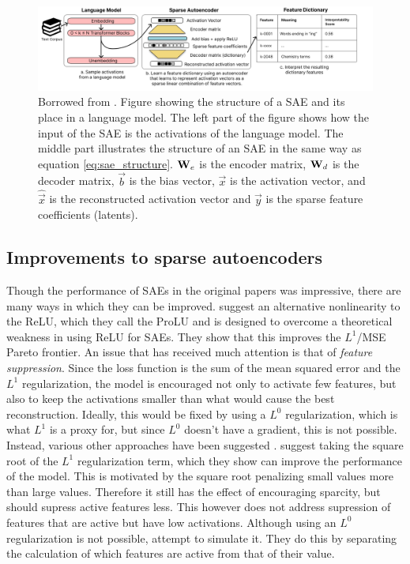 \begin{figure}[ht]
    \centering
    \includegraphics[width=\textwidth]{images/cunningham_sae_illustration.png}
    \caption{Borrowed from \textcite{cunningham_sparse_2023}. 
    Figure showing the structure of a SAE and its place in a language model.
    The left part of the figure shows how the input of the SAE is the activations of the language model.
    The middle part illustrates the structure of an SAE in the same way as equation \ref{eq:sae_structure}.
    $\mathbf{W}_e$ is the encoder matrix, $\mathbf{W}_d$ is the decoder matrix, $\vec b$ is the bias vector, $\vec x$ is the activation vector, and $\hat{\vec x}$ is the reconstructed activation vector and $\vec y$ is the sparse feature coefficients (latents).
    }
    \label{fig:cunningham_sae_illustration}
\end{figure}

\subsection{Improvements to sparse autoencoders}\label{sec:improvements_to_saes}
Though the performance of SAEs in the original papers \parencite{bricken_towards_2023}\parencite{cunningham_sparse_2023} was impressive, there are many ways in which they can be improved.
\textcite{taggart_prolu_2024} suggest an alternative nonlinearity to the ReLU, which they call the ProLU and is designed to overcome a theoretical weakness in using ReLU for SAEs.
They show that this improves the $L^1$/MSE Pareto frontier.
An issue that has received much attention is that of \emph{feature suppression}.
Since the loss function is the sum of the mean squared error and the $L^1$ regularization, the model is encouraged not only to activate few features, but also to keep the activations smaller than what would cause the best reconstruction.
Ideally, this would be fixed by using a $L^0$ regularization, which is what $L^1$ is a proxy for, but since $L^0$ doesn't have a gradient, this is not possible.
Instead, various other approaches have been suggested \parencite{wright_addressing_2024}.
\textcite{riggs_improving_2024} suggest taking the square root of the $L^1$ regularization term, which they show can improve the performance of the model.
This is motivated by the square root penalizing small values more than large values.
Therefore it still has the effect of encouraging sparcity, but should supress active features less.
This however does not address supression of features that are active but have low activations.
Although using an $L^0$ regularization is not possible, \textcite{rajamanoharan_improving_2024} attempt to simulate it.
They do this by separating the calculation of which features are active from that of their value.

